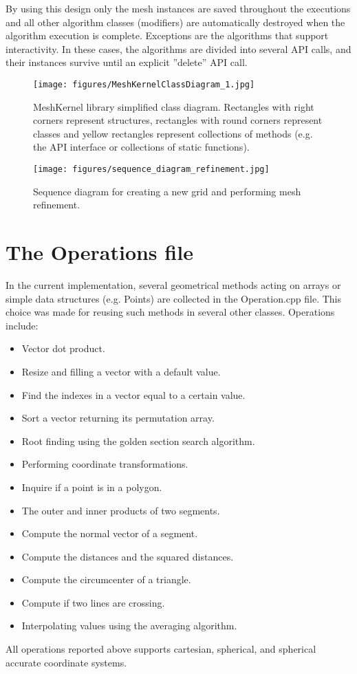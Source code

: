 \documentclass[biblatex]{deltares_manual}
\begin{document}
By using this design only the mesh instances are saved throughout the executions and all other algorithm classes (modifiers) are automatically destroyed when the algorithm execution is complete. Exceptions are the algorithms that support interactivity. In these cases, the algorithms are divided into several API calls, and their instances survive until an explicit ''delete'' API call.

\begin{figure}[H]
	\centering
	\texttt{[image: figures/MeshKernelClassDiagram\_1.jpg]}
	\caption{MeshKernel library simplified class diagram. Rectangles with right corners represent structures, rectangles with round corners represent classes and yellow rectangles represent collections of methods (e.g. the API interface or collections of static functions).}
	\label{fig:classDiagram}
\end{figure}
\begin{figure}[H]
	\centering
	\texttt{[image: figures/sequence\_diagram\_refinement.jpg]}
	\caption{Sequence diagram for creating a new grid and performing mesh refinement.}
	\label{fig:sequenceDiagram}
\end{figure}

\chapter{The Operations file}

In the current implementation, several geometrical methods acting on arrays or simple data structures (e.g. Points) are collected in the Operation.cpp file. This choice was made for reusing such methods in several other classes. Operations include:
\begin{itemize}
\item Vector dot product.
\item Resize and filling a vector with a default value.
\item Find the indexes in a vector equal to a certain value.
\item Sort a vector returning its permutation array.
\item Root finding using the golden section search algorithm.
\item Performing coordinate transformations.
\item Inquire if a point is in a polygon.
\item The outer and inner products of two segments.
\item Compute the normal vector of a segment.
\item Compute the distances and the squared distances.
\item Compute the circumcenter of a triangle.
\item Compute if two lines are crossing.
\item Interpolating values using the averaging algorithm.
\end{itemize}
All operations reported above supports cartesian, spherical, and spherical accurate coordinate systems.
\end{document}
